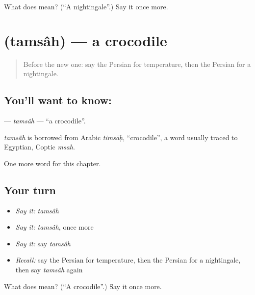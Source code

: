 \begin{tcolorbox}[breakable,colback=teal!4,colframe=teal!35!black,title={Before you move on}]
What does  mean? (\textquotedblleft{}A nightingale\textquotedblright{}.) Say it once more.
\end{tcolorbox}
\section[\texorpdfstring{\fa{تمساح} (tamsâh)}{تمساح (tamsâh)}]{ (tamsâh) — a crocodile}

\label{lesson:FA-C209-tamsah}



\begin{quote}
Before the new one: say the Persian for temperature, then the Persian for a nightingale.
\end{quote}

\subsection*{You'll want to know: }
\textbf{} — \emph{tamsâh} — \textquotedblleft{}a crocodile\textquotedblright{}.

\begin{cousinweb}
\emph{tamsâh} is borrowed from Arabic \emph{timsāḥ}, \textquotedblleft{}crocodile\textquotedblright{}, a word usually traced to Egyptian, Coptic \emph{msah}.
\end{cousinweb}

\begin{grammarlens}[title={What you've built}]
One more word for this chapter.
\end{grammarlens}

\subsection*{Your turn}
\begin{itemize}
\raggedright
  \item \emph{Say it:} \emph{tamsâh}
  \item \emph{Say it:} \emph{tamsâh}, once more
  \item \emph{Say it:} say \emph{tamsâh}
  \item \emph{Recall:} say the Persian for temperature, then the Persian for a nightingale, then say \emph{tamsâh} again
\end{itemize}

\begin{tcolorbox}[breakable,colback=teal!4,colframe=teal!35!black,title={Before you move on}]
What does  mean? (\textquotedblleft{}A crocodile\textquotedblright{}.) Say it once more.
\end{tcolorbox}
